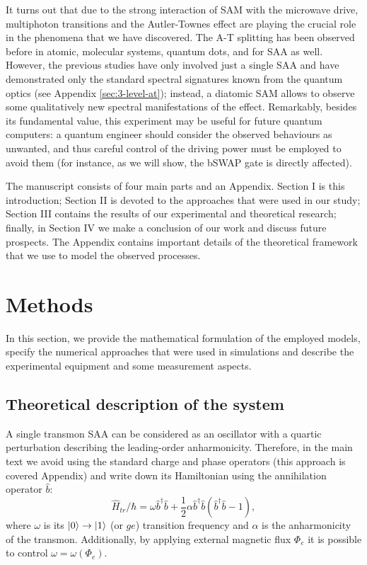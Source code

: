\documentclass[%
 aip,
 amsmath,amssymb,
 reprint,%
]{revtex4-1}
\begin{document}
It turns out that due to the strong interaction of SAM with the microwave drive, multiphoton transitions and the Autler-Townes effect are playing the crucial role in the phenomena that we have discovered. The A-T splitting has been observed before in atomic\cite{picque1976direct}, molecular systems\cite{tamarat1995pump}, quantum dots\cite{xu2007coherent}, and for SAA as well\cite{baur2009measurement, sillanpaa2009autler, novikov2013autler, suri2013observation, peng2018vacuum}. However, the previous studies have  only involved just a single SAA and have demonstrated only the standard spectral signatures known from the quantum optics (see Appendix \ref{sec:3-level-at}); instead, a diatomic SAM allows to observe some qualitatively new spectral manifestations of the effect. Remarkably, besides its fundamental value, this experiment may be useful for future quantum computers: a quantum engineer should consider the observed behaviours as unwanted, and thus careful control of the driving power must be employed to avoid them (for instance, as we will show, the bSWAP gate\cite{poletto2012entanglement} is directly affected).

The manuscript consists of four main parts and an Appendix. Section I is this introduction; Section II is devoted to the approaches that were used in our study; Section III contains the results of our experimental and theoretical research; finally, in Section IV we make a conclusion of our work and discuss future prospects. The Appendix contains important details of the theoretical framework that we use to model the observed processes.

\section{Methods}

In this section, we provide the mathematical formulation of the employed models, specify the numerical approaches that were used in simulations and describe the experimental equipment and some measurement aspects.  


\subsection{Theoretical description of the system}

A single transmon SAA can be considered as an oscillator with a quartic perturbation describing the leading-order anharmonicity. Therefore, in the main text we avoid using the standard charge and phase operators (this approach is covered Appendix) and write down its Hamiltonian using the annihilation operator $\hat b$:
\begin{equation}
\hat H_{tr}/\hbar = \omega \hat b^{\dagger}\hat b +\frac{1}{2}\alpha \hat b^{\dagger}\hat b(\hat b^{\dagger}\hat b-1),
\end{equation}
where $\omega$ is its $\ket{0}\rightarrow\ket{1}$ (or $ge$) transition frequency and $\alpha$ is the anharmonicity of the transmon. Additionally, by applying external magnetic flux $\Phi_e$ it is possible to control $\omega = \omega(\Phi_e)$\cite{koch2007charge}.
\end{document}

